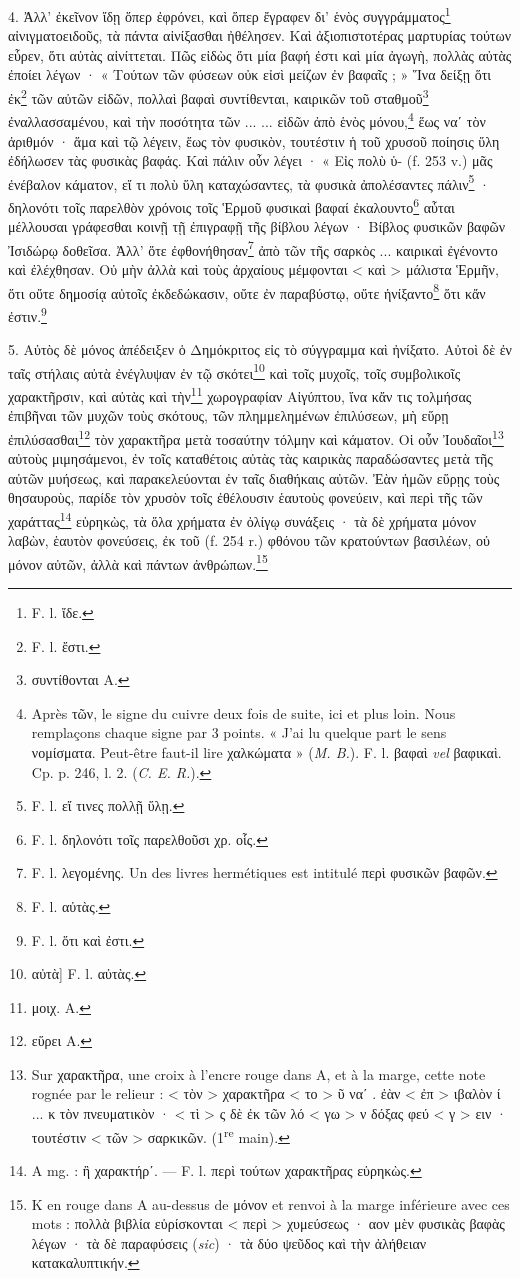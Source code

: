 \documentclass[landscape, a4paper, 11pt, oneside, polutonikogreek, french]{article}
\begin{document}
4. Ἀλλ' ἐκεῖνον ἴδῃ ὅπερ ἐφρόνει, καὶ ὅπερ ἔγραφεν δι' ἑνὸς συγγράμματος\footnote{F. l. ἴδε.} αἰνιγματοειδοῦς, τὰ πάντα αἰνίξασθαι ἠθέλησεν. Καὶ ἀξιοπιστοτέρας μαρτυρίας τούτων εὗρεν, ὅτι αὐτὰς αἰνίττεται. Πῶς εἰδὼς ὅτι μία βαφή ἐστι καὶ μία ἀγωγὴ, πολλὰς αὐτὰς ἐποίει λέγων · « Τούτων τῶν φύσεων οὐκ εἰσὶ μείζων ἐν βαφαῖς ; » Ἵνα δείξῃ ὅτι ἐκ\footnote{F. l. ἔστι.} τῶν αὐτῶν εἰδῶν, πολλαὶ βαφαὶ συντίθενται, καιρικῶν τοῦ σταθμοῦ\footnote{συντίθονται A.} ἐναλλασσαμένου, καὶ τὴν ποσότητα τῶν ... ... εἰδῶν ἀπὸ ἑνὸς μόνου,\footnote{Après τῶν, le signe du cuivre deux fois de suite, ici et plus loin. Nous remplaçons chaque signe par 3 points. « J'ai lu quelque part le sens νομίσματα. Peut-être faut-il lire χαλκώματα » (\emph{M. B.}). F. l. βαφαὶ \emph{vel} βαφικαὶ. Cp. p. 246, l. 2. (\emph{C. E. R.}).} ἕως ναʹ τὸν ἀριθμόν · ἅμα καὶ τῷ λέγειν, ἕως τὸν φυσικὸν, τουτέστιν ἡ τοῦ χρυσοῦ ποίησις ὕλη ἐδήλωσεν τὰς φυσικὰς βαφάς. Καὶ πάλιν οὖν λέγει · « Εἰς πολὺ ὑ- (f. 253 v.) μᾶς ἐνέβαλον κάματον, εἴ τι πολὺ ὕλη καταχώσαντες, τὰ φυσικὰ ἀπολέσαντες πάλιν\footnote{F. l. εἴ τινες πολλῇ ὕλῃ.} · δηλονότι τοῖς παρελθὸν χρόνοις τοῖς Ἑρμοῦ φυσικαὶ βαφαί ἐκαλουντο\footnote{F. l. δηλονότι τοῖς παρελθοῦσι χρ. οἷς.} αὗται μέλλουσαι γράφεσθαι κοινῇ τῇ ἐπιγραφῇ τῆς βίβλου λέγων · Βίβλος φυσικῶν βαφῶν Ἰσιδώρῳ δοθεῖσα. Ἀλλ' ὅτε ἐφθονήθησαν\footnote{F. l. λεγομένης. Un des livres hermétiques est intitulé περὶ φυσικῶν βαφῶν.} ἀπὸ τῶν τῆς σαρκὸς ... καιρικαὶ ἐγένοντο καὶ ἐλέχθησαν. Οὐ μὴν ἀλλὰ καὶ τοὺς ἀρχαίους μέμφονται < καὶ > μάλιστα Ἑρμῆν, ὅτι οὔτε δημοσίᾳ αὐτοῖς ἐκδεδώκασιν, οὔτε ἐν παραβύστῳ, οὔτε ἡνίξαντο\footnote{F. l. αὐτὰς.} ὅτι κἄν ἐστιν.\footnote{F. l. ὅτι καὶ ἐστι.}

5. Αὐτὸς δὲ μόνος ἀπέδειξεν ὁ Δημόκριτος εἰς τὸ σύγγραμμα καὶ ἠνίξατο. Αὐτοὶ δὲ ἐν ταῖς στήλαις αὐτὰ ἐνέγλυψαν ἐν τῷ σκότει\footnote{αὐτὰ] F. l. αὐτὰς.} καὶ τοῖς μυχοῖς, τοῖς συμβολικοῖς χαρακτῆρσιν, καὶ αὐτὰς καὶ τὴν\footnote{μοιχ. A.} χωρογραφίαν Αἰγύπτου, ἵνα κἄν τις τολμήσας ἐπιβῆναι τῶν μυχῶν τοὺς σκότους, τῶν πλημμελημένων ἐπιλύσεων, μὴ εὕρῃ ἐπιλύσασθαι\footnote{εὕρει A.} τὸν χαρακτῆρα μετὰ τοσαύτην τόλμην καὶ κάματον. Οἱ οὖν Ἰουδαῖοι\footnote{Sur χαρακτῆρα, une croix à l'encre rouge dans A, et à la marge, cette note rognée par le relieur : < τὸν > χαρακτῆρα < το > ῦ ναʹ . ἐὰν < ἐπ > ιβαλὸν ί ... κ τὸν πνευματικὸν · < τὶ > ς δὲ ἐκ τῶν λό < γω > ν δόξας φεύ < γ > ειν · τουτέστιν < τῶν > σαρκικῶν. (1\textsuperscript{re} main).} αὐτοὺς μιμησάμενοι, ἐν τοῖς καταθέτοις αὐτὰς τὰς καιρικὰς παραδώσαντες μετὰ τῆς αὐτῶν μυήσεως, καὶ παρακελεύονται ἐν ταῖς διαθήκαις αὐτῶν. Ἐὰν ἡμῶν εὕρῃς τοὺς θησαυροὺς, παρίδε τὸν χρυσὸν τοῖς ἐθέλουσιν ἑαυτοὺς φονεύειν, καὶ περὶ τῆς τῶν χαράττας\footnote{A mg. : ἢ χαρακτήρʹ. --- F. l. περὶ τούτων χαρακτῆρας εὑρηκὼς.} εὑρηκὼς, τὰ ὅλα χρήματα ἐν ὀλίγῳ συνάξεις · τὰ δὲ χρήματα μόνον λαβὼν, ἑαυτὸν φονεύσεις, ἐκ τοῦ (f. 254 r.) φθόνου τῶν κρατούντων βασιλέων, οὐ μόνον αὐτῶν, ἀλλὰ καὶ πάντων ἀνθρώπων.\footnote{K en rouge dans A au-dessus de μόνον et renvoi à la marge inférieure avec ces mots : πολλὰ βιβλία εὑρίσκονται < περὶ > χυμεύσεως · αον μὲν φυσικὰς βαφὰς λέγων · τὰ δὲ παραφύσεις (\emph{sic}) · τὰ δύο ψεῦδος καὶ τὴν ἀλήθειαν κατακαλυπτικήν.}
\end{document}
